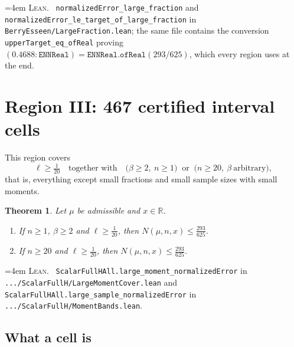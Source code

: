\documentclass[10pt,a4paper]{article}
\theoremstyle{plain}
\newtheorem{theorem}{Theorem}[section]
\theoremstyle{definition}
\newcommand{\R}{\mathbb{R}}
\newcommand{\lean}[1]{\texttt{#1}}
\newcommand{\file}[1]{\texttt{#1}}
\newenvironment{leanref}%
  {\par\addvspace{3pt}\begingroup\sloppy\emergencystretch=4em
   \noindent\footnotesize\textsc{Lean.}\ \ignorespaces}%
  {\par\endgroup\addvspace{3pt}}
\begin{document}
\begin{leanref}
\lean{normalizedError\_large\_fraction} and
\lean{normalizedError\_le\_target\_of\_large\_fraction} in
\file{BerryEsseen/LargeFraction.lean}; the same file contains the conversion
\lean{upperTarget\_eq\_ofReal} proving
$(0.4688:\lean{ENNReal})=\lean{ENNReal.ofReal}(293/625)$, which every region
uses at the end.
\end{leanref}

\section{Region III: 467 certified interval cells}
\label{sec:scalar}

This region covers
\[
  \ell\ge\tfrac1{20}
  \quad\text{together with}\quad
  \bigl(\beta\ge2,\ n\ge1\bigr)
  \ \text{ or }\
  \bigl(n\ge20,\ \beta\ \text{arbitrary}\bigr),
\]
that is, everything except small fractions and small sample sizes with small
moments.

\begin{theorem}\label{thm:scalar}
Let $\mu$ be admissible and $x\in\R$.
\begin{enumerate}[label=(\alph*),leftmargin=2.4em]
\item If $n\ge1$, $\beta\ge2$ and $\ell\ge\tfrac1{20}$, then
  $N(\mu,n,x)\le\tfrac{293}{625}$.
\item If $n\ge20$ and $\ell\ge\tfrac1{20}$, then
  $N(\mu,n,x)\le\tfrac{293}{625}$.
\end{enumerate}
\end{theorem}

\begin{leanref}
\lean{ScalarFullHAll.large\_moment\_normalizedError} in
\file{.../ScalarFullH/LargeMomentCover.lean} and
\lean{ScalarFullHAll.large\_sample\_normalizedError} in
\file{.../ScalarFullH/MomentBands.lean}.
\end{leanref}

\subsection{What a cell is}
\end{document}
